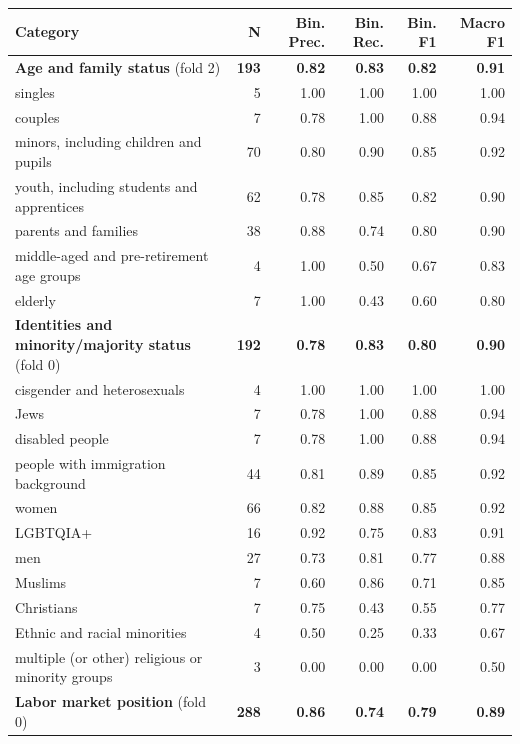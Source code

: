 \begin{table}[t]
\centering
\small
\begin{tabular}{l r r r r r}
\toprule
Category & N & Bin. Prec. & Bin. Rec. & Bin. F1 & Macro F1 \\
\midrule
\addlinespace
\textbf{Age and family status} (fold 2) & \textbf{193} & \textbf{0.82} & \textbf{0.83} & \textbf{0.82} & \textbf{0.91} \\
\quad singles & 5 & 1.00 & 1.00 & 1.00 & 1.00 \\
\quad couples & 7 & 0.78 & 1.00 & 0.88 & 0.94 \\
\quad minors, including children and pupils & 70 & 0.80 & 0.90 & 0.85 & 0.92 \\
\quad youth, including students and apprentices & 62 & 0.78 & 0.85 & 0.82 & 0.90 \\
\quad parents and families & 38 & 0.88 & 0.74 & 0.80 & 0.90 \\
\quad middle-aged and pre-retirement age groups & 4 & 1.00 & 0.50 & 0.67 & 0.83 \\
\quad elderly & 7 & 1.00 & 0.43 & 0.60 & 0.80 \\
\addlinespace
\textbf{Identities and minority/majority status} (fold 0) & \textbf{192} & \textbf{0.78} & \textbf{0.83} & \textbf{0.80} & \textbf{0.90} \\
\quad cisgender and heterosexuals & 4 & 1.00 & 1.00 & 1.00 & 1.00 \\
\quad Jews & 7 & 0.78 & 1.00 & 0.88 & 0.94 \\
\quad disabled people & 7 & 0.78 & 1.00 & 0.88 & 0.94 \\
\quad people with immigration background & 44 & 0.81 & 0.89 & 0.85 & 0.92 \\
\quad women & 66 & 0.82 & 0.88 & 0.85 & 0.92 \\
\quad LGBTQIA+ & 16 & 0.92 & 0.75 & 0.83 & 0.91 \\
\quad men & 27 & 0.73 & 0.81 & 0.77 & 0.88 \\
\quad Muslims & 7 & 0.60 & 0.86 & 0.71 & 0.85 \\
\quad Christians & 7 & 0.75 & 0.43 & 0.55 & 0.77 \\
\quad Ethnic and racial minorities & 4 & 0.50 & 0.25 & 0.33 & 0.67 \\
\quad multiple (or other) religious or minority groups & 3 & 0.00 & 0.00 & 0.00 & 0.50 \\
\addlinespace
\textbf{Labor market position} (fold 0) & \textbf{288} & \textbf{0.86} & \textbf{0.74} & \textbf{0.79} & \textbf{0.89} \\

\end{tabular}
\end{table}
